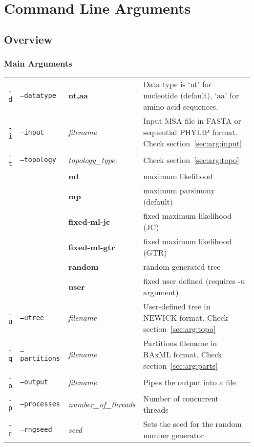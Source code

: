 \section{Command Line Arguments}
\label{sec:arguments}

\subsection{Overview}

\subsubsection{Main Arguments}

\begin{tabular}{rllp{}}
  \hline
  \texttt{-d} & \texttt{--datatype}   & \bf{nt},\bf{aa} & Data type is `nt' for nucleotide (default), `aa' for amino-acid sequences. \\
  \texttt{-i} & \texttt{--input}      & {\em filename} & Input MSA file in FASTA or sequential PHYLIP format. Check section~\ref{sec:arg:input} \\
  \texttt{-t} & \texttt{--topology}   & {\em topology\_type}. & Check section~\ref{sec:arg:topo} \\
               && \bf{ml}             & maximum likelihood \\
               && \bf{mp}             & maximum parsimony (default)\\
               && \bf{fixed-ml-jc}    & fixed maximum likelihood (JC) \\
               && \bf{fixed-ml-gtr}   & fixed maximum likelihood (GTR) \\
               && \bf{random}         & random generated tree \\
               && \bf{user}           & fixed user defined (requires -u argument) \\
  \texttt{-u} & \texttt{--utree}      & {\em filename} & User-defined tree in NEWICK format. Check section~\ref{sec:arg:topo}\\
  \texttt{-q} & \texttt{--partitions} & {\em filename} & Partitions filename in RAxML format. Check section~\ref{sec:arg:parts} \\
  \texttt{-o} & \texttt{--output}     & {\em filename} & Pipes the output into a file \\
  \texttt{-p} & \texttt{--processes}  & {\em number\_of\_threads} & Number of concurrent threads \\
  \texttt{-r} & \texttt{--rngseed}    & {\em seed} & Sets the seed for the random number generator \\
  \hline
\end{tabular}

